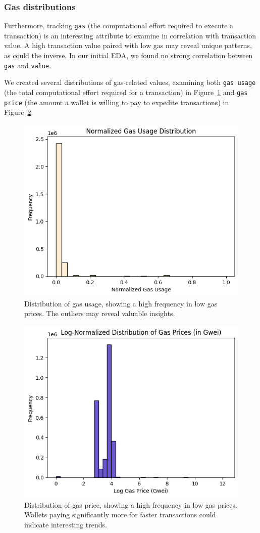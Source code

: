 \documentclass[sigconf]{acmart}
\begin{document}
\subsubsection{Gas distributions}
Furthermore, tracking \texttt{gas} (the computational effort required to execute a transaction) is an interesting attribute to examine in correlation with transaction value. A high transaction value paired with low gas may reveal unique patterns, as could the inverse. In our initial EDA, we found no strong correlation between \texttt{gas} and \texttt{value}.

We created several distributions of gas-related values, examining both \texttt{gas usage} (the total computational effort required for a transaction) in Figure~\ref{fig:gasUsage} and \texttt{gas price} (the amount a wallet is willing to pay to expedite transactions) in Figure~\ref{fig:gasPrice}.

\begin{figure}[H]
    \centering
    \includegraphics[width=0.8\linewidth]{M6-normalized-distro-gas.png}
    \caption{Distribution of gas usage, showing a high frequency in low gas prices. The outliers may reveal valuable insights.}
    \label{fig:gasUsage}
\end{figure}

\begin{figure}[H]
    \centering
    \includegraphics[width=0.8\linewidth]{M6-normalized-distro-gas-price.png}
    \caption{Distribution of gas price, showing a high frequency in low gas prices. Wallets paying significantly more for faster transactions could indicate interesting trends.}
    \label{fig:gasPrice}
\end{figure}
\end{document}
